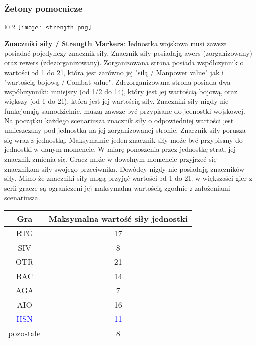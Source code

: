 \subsubsection*{Żetony pomocnicze}
\begin{wrapfigure}{l}{0.2\textwidth}
  \texttt{[image: strength.png]}
\end{wrapfigure}
\textbf{Znaczniki siły / Strength Markers}: Jednostka wojskowa musi zawsze posiadać pojedynczy znacznik siły. Znacznik siły posiadają awers (zorganizowany) oraz rewers (zdezorganizowany). Zorganizowana strona posiada współczynnik o wartości od 1 do 21, która jest zarówno jej "silą / Manpower value" jak i "wartością bojową / Combat value". Zdezorganizowana strona posiada dwa współczynniki: mniejszy (od 1/2 do 14), który jest jej wartością bojową, oraz większy (od 1 do 21), która jest jej wartością siły. Znaczniki siły nigdy nie funkcjonują samodzielnie, muszą zawsze być przypisane do jednostki wojskowej. Na początku każdego scenariusza znacznik siły o odpowiedniej wartości jest umieszczany pod jednostką na jej zorganizowanej stronie. Znacznik siły porusza się wraz z jednostką. Maksymalnie jeden znacznik siły może być przypisany do jednostki w danym momencie. W miarę ponoszenia przez jednostkę strat, jej znacznik zmienia się. Gracz może w dowolnym momencie przyjrzeć się znacznikom siły swojego przeciwnika. Dowódcy nigdy nie posiadają znaczników siły.
Mimo że znaczniki siły mogą przyjąć wartości od 1 do 21, w większości gier z serii gracze są ograniczeni jej maksymalną wartością zgodnie z założeniami scenariusza.\par
\begin{center}
  \begin{tabular}{ |c|c| }
    \hline
    \rowcolor{gray!80}\textbf{Gra} & \textbf{Maksymalna wartość siły jednostki} \\
    \hline
    RTG                            & 17                                         \\
    \hline
    SIV                            & 8                                          \\
    \hline
    OTR                            & 21                                         \\
    \hline
    BAC                            & 14                                         \\
    \hline
    AGA                            & 7                                          \\
    \hline
    AIO                            & 16                                         \\
    \hline
    \textcolor{blue}{HSN}          & \textcolor{blue}{11}                       \\
    \hline
    pozostałe                      & 8                                          \\
    \hline
  \end{tabular}
\end{center}

